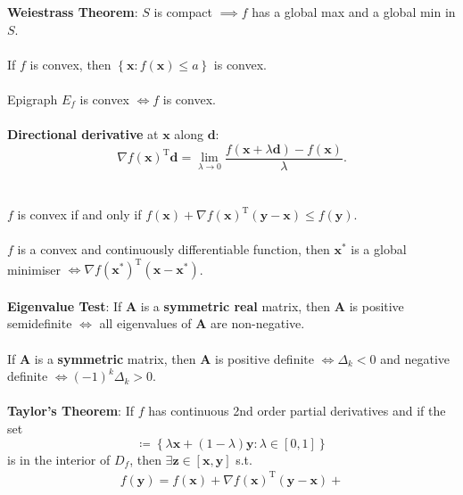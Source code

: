 \documentclass[12pt]{article}
\begin{document}
    \begin{multicols}{3}
        \textbf{Weiestrass Theorem}: $S$ is compact $\implies f$ has a global max and a global min in $S$.
        \\\\
        If $f$ is convex, then $\left\{\bm{x} \colon f(\bm{x}) \leq a \right\}$ is convex.
        \\\\
        Epigraph $E_f$ is convex $\iff f$ is convex.
        \\\\
        \textbf{Directional derivative} at $\bm{x}$ along $\bm{d}$: 
        \begin{equation*}
            \nabla f(\bm{x})^{\mathrm{T}}\bm{d} = \lim_{\lambda \to 0}\frac{f(\bm{x} + \lambda\bm{d}) - f(\bm{x})}{\lambda}.
        \end{equation*}
        \\\\
        $f$ is convex if and only if $f(\bm{x}) + \nabla f(\bm{x})^{\mathrm{T}}(\bm{y - x}) \leq f(\bm{y})$.
        \\\\
        $f$ is a convex and continuously differentiable function, then $\bm{x}^*$ is a global minimiser $\iff \nabla f(\bm{x}^*)^{\mathrm{T}}(\bm{x - x}^*)$.
        \\\\
        \textbf{Eigenvalue Test}: If $\bm{A}$ is a \textbf{symmetric real} matrix, then $\bm{A}$ is positive semidefinite $\iff$ all eigenvalues of $\bm{A}$ are non-negative.
        \\\\
        If $\bm{A}$ is a \textbf{symmetric} matrix, then $\bm{A}$ is positive definite $\iff \Delta_k < 0$ and negative definite $\iff (-1)^k\Delta_k > 0$.
        \\\\
        \textbf{Taylor's Theorem}: If $f$ has continuous 2nd order partial derivatives and if the set
        \begin{displaymath}
            [\bm{x}, \bm{y}] \coloneqq \left\{\lambda\bm{x} + (1 - \lambda)\bm{y} \colon \lambda \in [0, 1]\right\}
        \end{displaymath}  
        is in the interior of $D_f$, then $\exists \bm{z} \in [\bm{x}, \bm{y}]$ s.t. 
        \begin{multline*}
            f(\bm{y}) = f(\bm{x}) + \nabla f(\bm{x})^{\mathrm{T}}(\bm{y - x}) + \\

\end{multline*}
\end{multicols}
\end{document}
